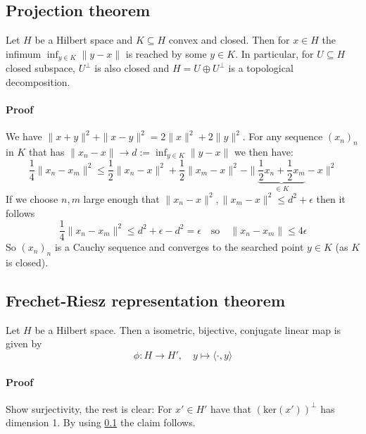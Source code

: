 \documentclass{scrartcl}
\begin{document}
\subsection{Projection theorem}
\label{projection_theorem}
Let $H$ be a Hilbert space and $K \subseteq H$ convex and closed. Then for $x \in H$ the infimum $\inf_{y \in K} \| y - x\|$ is reached by some $y \in K$. In particular, for $U \subseteq H$ closed subspace, $U^\perp$ is also closed and $H = U \oplus U^\perp$ is a topological decomposition.
\paragraph{Proof} We have $\| x + y \|^2 + \| x - y \|^2 = 2\| x \|^2 + 2\| y \|^2$. For any sequence $(x_n)_n$ in $K$ that has $\| x_n - x \| \to d := \inf_{y \in K} \| y - x\|$ we then have:
\begin{equation*}
    \frac 1 4 \| x_n - x_m \|^2 \leq \frac 1 2 \| x_n - x \|^2 + \frac 1 2 \| x_m - x \|^2 - \| \underbrace{\frac 1 2 x_n + \frac 1 2 x_m}_{\in K} - x \|^2 
\end{equation*}
If we choose $n, m$ large enough that $\| x_n - x \|^2, \| x_m - x \|^2 \leq d^2 + \epsilon$ then it follows
\begin{equation*}
    \frac 1 4 \| x_n - x_m \|^2 \leq d^2 + \epsilon - d^2 = \epsilon \quad \text{so} \quad \| x_n - x_m \| \leq 4\epsilon
\end{equation*}
So $(x_n)_n$ is a Cauchy sequence and converges to the searched point $y \in K$ (as $K$ is closed).

\subsection{Frechet-Riesz representation theorem}
Let $H$ be a Hilbert space. Then a isometric, bijective, conjugate linear map is given by
\begin{equation*}
    \phi: H \to H', \quad y \mapsto \langle \cdot , y \rangle
\end{equation*}
\paragraph{Proof} Show surjectivity, the rest is clear: For $x' \in H'$ have that $(\mathrm{ker}(x'))^\perp$ has dimension 1. By using \ref{projection_theorem} the claim follows.
\end{document}
